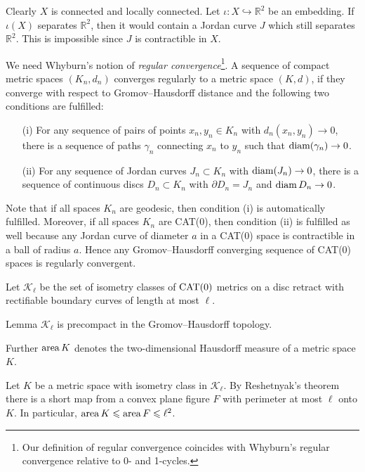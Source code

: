 \documentclass[a4paper,10pt]{amsart}
\begin{document}
Clearly $X$ is connected and locally connected. Let $\iota :X\hookrightarrow\mathbb{R}^2$ be an embedding.
If $\iota(X)$ separates $\mathbb{R}^2$, then it would contain a Jordan curve $J$ which still separates
$\mathbb{R}^2$. This is impossible since $J$ is contractible in $X$.
\qeds

We need Whyburn's notion of {\em regular convergence}\footnote{Our definition of regular convergence coincides with Whyburn's regular convergence relative
to 0- and 1-cycles.}. A sequence of compact metric spaces $(K_n,d_n)$ converges regularly to a 
metric space $(K,d)$, if they converge with respect to Gromov--Hausdorff distance and the following two conditions are fulfilled:
\begin{itemize}
 \item[(i)] For any sequence of pairs of points $x_n,y_n\in K_n$ with $d_n(x_n,y_n)\to 0$, there is a sequence of paths $\gamma_n$
 connecting $x_n$ to $y_n$ such that $\mathop{\rm diam}\nolimits(\gamma_n)\to 0$.
 \item[(ii)] For any sequence of Jordan curves $J_n\subset K_n$ with $\mathop{\rm diam}\nolimits(J_n)\to 0$, there is a sequence of continuous discs $D_n\subset K_n$
 with $\partial D_n=J_n$ and $\mathop{\rm diam}\nolimits D_n\to 0$. 
\end{itemize}

Note that if all spaces $K_n$ are geodesic, then condition (i) is automatically fulfilled. Moreover, if all 
spaces $K_n$ are CAT(0), then condition (ii) is fulfilled as well because any Jordan curve of diameter $a$ in a CAT(0)
space is contractible in a ball of radius $a$. Hence any Gromov--Hausdorff converging sequence of CAT(0) spaces is 
regularly convergent.

Let $\mathcal{K}_\ell$ be the set of isometry classes of $\mathop{\rm CAT}\nolimits(0)$ metrics on a disc retract with rectifiable
boundary curves of length at most $\ell$.



\begin{thm}{Lemma}
$\mathcal{K}_\ell$ is precompact in the Gromov--Hausdorff topology.
\end{thm}

Further $\mathop{\rm area}\nolimits K$ denotes the two-dimensional Hausdorff measure of a metric space $K$. 

Let $K$ be a metric space with isometry class in $\mathcal {K}_\ell$.
By Reshetnyak's theorem there is a short map from a convex plane figure $F$ with perimeter at most $\ell$ onto $K$.
In particular, $\mathop{\rm area}\nolimits K \leqslant \mathop{\rm area}\nolimits F 
\leqslant \ell^2$.
\end{document}
